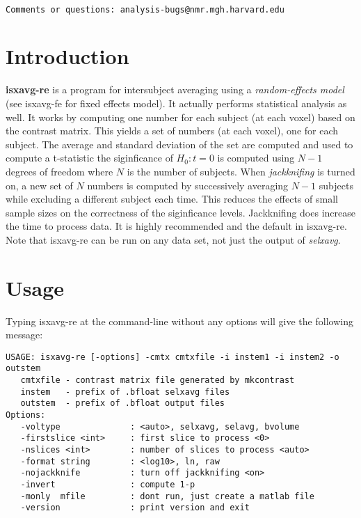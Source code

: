 \documentclass[10pt]{article}
\begin{document}
\begin{Large}
 \\
\end{Large}

\noindent 
\begin{verbatim}
Comments or questions: analysis-bugs@nmr.mgh.harvard.edu
\end{verbatim}

\section{Introduction}

{\bf isxavg-re} is a program for intersubject averaging using a {\em
random-effects model} (see isxavg-fe for fixed effects model).  It
actually performs statistical analysis as well.  It works by computing
one number for each subject (at each voxel) based on the contrast
matrix.  This yields a set of numbers (at each voxel), one for each
subject.  The average and standard deviation of the set are computed
and used to compute a t-statistic the siginficance of $H_0: t=0$ is
computed using $N-1$ degrees of freedom where $N$ is the number of
subjects.  When {\em jackknifing} is turned on, a new set of $N$
numbers is computed by successively averaging $N-1$ subjects while
excluding a different subject each time.  This reduces the effects of
small sample sizes on the correctness of the siginficance levels.
Jackknifing does increase the time to process data.  It is highly
recommended and the default in isxavg-re.  Note that isxavg-re can be
run on any data set, not just the output of {\em selxavg}.

\section{Usage}
Typing isxavg-re at the command-line without any options will give the
following message:\\ 

\begin{small}
\begin{verbatim}
USAGE: isxavg-re [-options] -cmtx cmtxfile -i instem1 -i instem2 -o outstem
   cmtxfile - contrast matrix file generated by mkcontrast
   instem   - prefix of .bfloat selxavg files
   outstem  - prefix of .bfloat output files
Options:
   -voltype              : <auto>, selxavg, selavg, bvolume
   -firstslice <int>     : first slice to process <0>
   -nslices <int>        : number of slices to process <auto>
   -format string        : <log10>, ln, raw
   -nojackknife          : turn off jackknifing <on> 
   -invert               : compute 1-p
   -monly  mfile         : dont run, just create a matlab file
   -version              : print version and exit
\end{verbatim}
\end{small}
\end{document}
